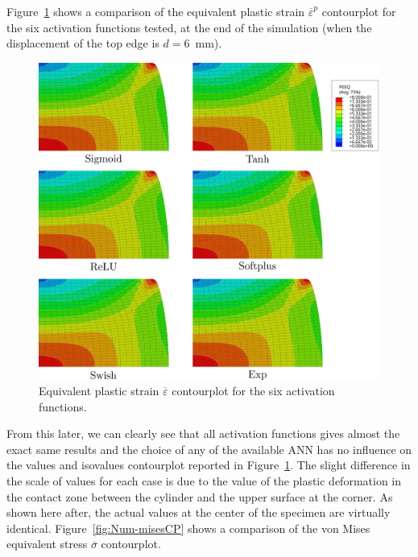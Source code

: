 \documentclass[algorithms,article,submit,pdftex,oneauthors]{Definitions/mdpi}
\begin{document}
Figure~\ref{fig:Num-peeqCP} shows a comparison of the equivalent plastic strain $\overline{\varepsilon}^p$ contourplot for the six activation functions tested, at the end of the simulation (when the displacement of the top edge is $d=6$~mm).
\begin{figure}[h!]
\centering
\includegraphics[width=0.9\columnwidth]{Figures/PeeqHalf}
\caption{Equivalent plastic strain $\overline{\varepsilon}$ contourplot for the six activation functions.}
\label{fig:Num-peeqCP}
\end{figure}
From this later, we can clearly see that all activation functions gives almost the exact same results and the choice of any of the available ANN has no influence on the values and isovalues contourplot reported in Figure~\ref{fig:Num-peeqCP}.
The slight difference in the scale of values for each case is due to the value of the plastic deformation in the contact zone between the cylinder and the upper surface at the corner.
As shown here after, the actual values at the center of the specimen are virtually identical.
Figure~\ref{fig:Num-misesCP} shows a comparison of the von Mises equivalent stress $\overline{\sigma}$ contourplot.
\end{document}
